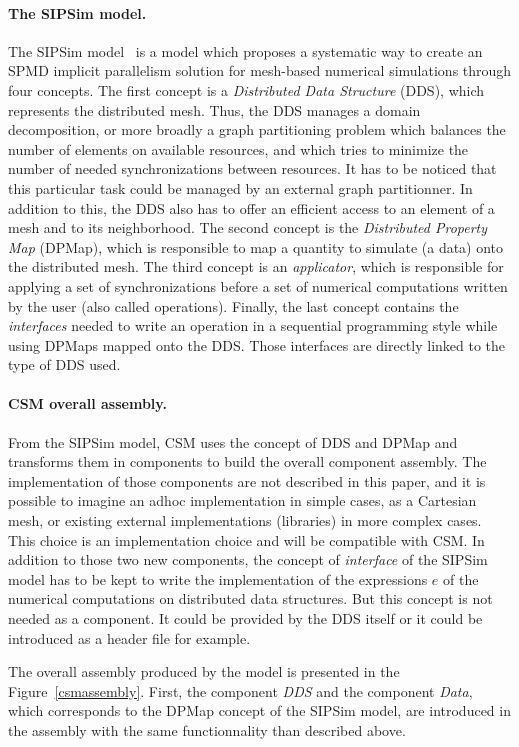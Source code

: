 \paragraph{The SIPSim model.} The SIPSim model~\cite{} is a model which proposes a systematic way to create an SPMD implicit parallelism solution for mesh-based numerical simulations through four concepts. The first concept is a \textit{Distributed Data Structure} (DDS), which represents the distributed mesh. Thus, the DDS manages a domain decomposition, or more broadly a graph partitioning problem which balances the number of elements on available resources, and which tries to minimize the number of needed synchronizations between resources. It has to be noticed that this particular task could be managed by an external graph partitionner. In addition to this, the DDS also has to offer an efficient access to an element of a mesh and to its neighborhood. The second concept is the \textit{Distributed Property Map} (DPMap), which is responsible to map a quantity to simulate (a data) onto the distributed mesh. The third concept is an \textit{applicator}, which is responsible for applying a set of synchronizations before a set of numerical computations written by the user (also called operations). Finally, the last concept contains the \textit{interfaces} needed to write an operation in a sequential programming style while using DPMaps mapped onto the DDS. Those interfaces are directly linked to the type of DDS used.

\paragraph{CSM overall assembly.} From the SIPSim model, CSM uses the concept of DDS and DPMap and transforms them in components to build the overall component assembly. The implementation of those components are not described in this paper, and it is possible to imagine an adhoc implementation in simple cases, as a Cartesian mesh, or existing external implementations (libraries) in more complex cases. This choice is an implementation choice and will be compatible with CSM. In addition to those two new components, the concept of \textit{interface} of the SIPSim model has to be kept to write the implementation of the expressions $e$ of the numerical computations on distributed data structures. But this concept is not needed as a component. It could be provided by the DDS itself or it could be introduced as a header file for example.

The overall assembly produced by the model is presented in the Figure~\ref{csmassembly}. First, the component \textit{DDS} and the component \textit{Data}, which corresponds to the DPMap concept of the SIPSim model, are introduced in the assembly with the same functionnality than described above. 

